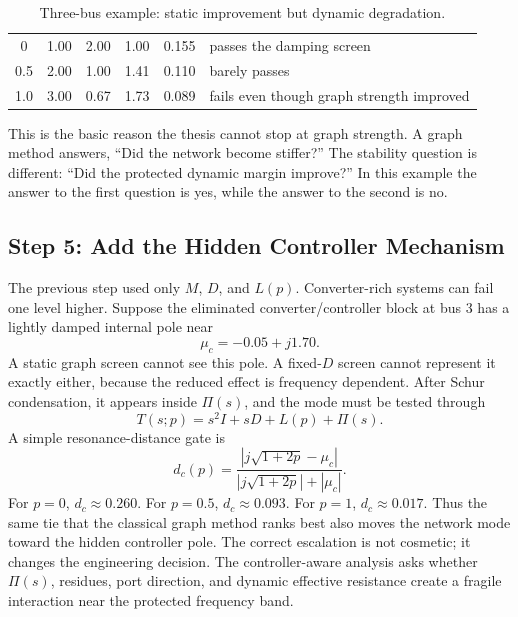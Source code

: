 \begin{table}[ht]
\centering
\small
\caption{Three-bus example: static improvement but dynamic degradation.}
\label{tab:framework_three_bus_failure}
\begin{tabular}{c c c c c L{0.23\textwidth}}
\toprule
{}
 &  & 
& 
&  & \\
 & 1.00 & 2.00 & 1.00 & 0.155 & passes the damping screen\\
0.5 & 2.00 & 1.00 & 1.41 & 0.110 & barely passes\\
1.0 & 3.00 & 0.67 & 1.73 & 0.089 & fails even though graph strength improved\\
\bottomrule
\end{tabular}
\end{table}

This is the basic reason the thesis cannot stop at graph strength. A graph
method answers, ``Did the network become stiffer?'' The stability question is
different: ``Did the protected dynamic margin improve?'' In this example the
answer to the first question is yes, while the answer to the second is no.

\subsection{Step 5: Add the Hidden Controller Mechanism}

The previous step used only \(M\), \(D\), and \(L(p)\). Converter-rich systems
can fail one level higher. Suppose the eliminated converter/controller block at
bus 3 has a lightly damped internal pole near
\begin{equation}
  \mu_c=-0.05+j1.70 .
  \label{eq:framework_three_bus_controller_pole}
\end{equation}
A static graph screen cannot see this pole. A fixed-\(D\) screen cannot
represent it exactly either, because the reduced effect is frequency
dependent. After Schur condensation, it appears inside \(\Pi(s)\), and the
mode must be tested through
\begin{equation}
  T(s;p)=s^2I+sD+L(p)+\Pi(s).
  \label{eq:framework_three_bus_nep}
\end{equation}
A simple resonance-distance gate is
\begin{equation}
  d_c(p)=
  \frac{|j\sqrt{1+2p}-\mu_c|}
       {|j\sqrt{1+2p}|+|\mu_c|}.
  \label{eq:framework_three_bus_controller_distance}
\end{equation}
For \(p=0\), \(d_c\approx0.260\). For \(p=0.5\), \(d_c\approx0.093\). For
\(p=1\), \(d_c\approx0.017\). Thus the same tie that the classical graph
method ranks best also moves the network mode toward the hidden controller
pole. The correct escalation is not cosmetic; it changes the engineering
decision. The controller-aware analysis asks whether
\(\Pi(s)\), residues, port direction, and dynamic effective resistance create a
fragile interaction near the protected frequency band.

